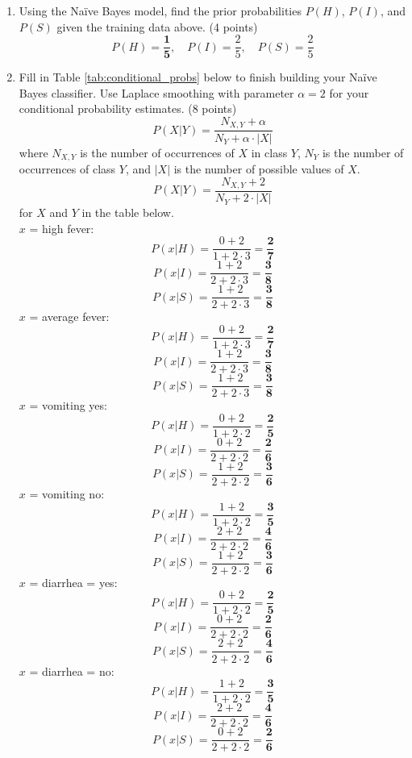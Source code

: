 \documentclass[a3paper,12pt]{article} %
\begin{document}
\begin{enumerate}
    \item Using the Na\"ive Bayes model, find the prior probabilities \( P(H) \), \( P(I) \), and \( P(S) \) given the training data above. (4 points)
    \[
    P(H) = \mathbf{\frac{1}{5}}, \quad P(I) = \frac{2}{5}, \quad P(S) = \frac{2}{5}
    \]
    \item Fill in Table \ref{tab:conditional_probs} below to finish building your Na\"ive Bayes classifier. Use Laplace smoothing with parameter \( \alpha = 2 \) for your conditional probability estimates. (8 points)
    \[
    P(X|Y) = \frac{N_{X,Y} + \alpha}{N_Y + \alpha \cdot |X|}
    \]
    where \( N_{X,Y} \) is the number of occurrences of \( X \) in class \( Y \), \( N_Y \) is the number of occurrences of class \( Y \), and \( |X| \) is the number of possible values of \( X \).
    \[
    P(X|Y) = \frac{N_{X,Y} + 2}{N_Y + 2 \cdot |X|}
    \]
    for \( X \) and \( Y \) in the table below.
    \\ \(x\) = high fever:
    \[
    P(x|H) = \frac{0 + 2}{1 + 2 \cdot 3} = \mathbf{\frac{2}{7}}
    \] 
    \[
    P(x|I) = \frac{1 + 2}{2 + 2 \cdot 3} = \mathbf{\frac{3}{8}}
    \]
    \[
    P(x|S) = \frac{1 + 2}{2 + 2 \cdot 3} = \mathbf{\frac{3}{8}}
    \]
    \(x\) = average fever:
    \[
    P(x|H) = \frac{0 + 2}{1 + 2 \cdot 3} = \mathbf{\frac{2}{7}}
    \]
    \[
    P(x|I) = \frac{1 + 2}{2 + 2 \cdot 3} = \mathbf{\frac{3}{8}}
    \]
    \[
    P(x|S) = \frac{1 + 2}{2 + 2 \cdot 3} = \mathbf{\frac{3}{8}}
    \]
    \(x\) = vomiting yes:
    \[
    P(x|H) = \frac{0 + 2}{1 + 2 \cdot 2} = \mathbf{\frac{2}{5}}
    \]
    \[
    P(x|I) = \frac{0 + 2}{2 + 2 \cdot 2} = \mathbf{\frac{2}{6}}
    \]
    \[
    P(x|S) = \frac{1 + 2}{2 + 2 \cdot 2} = \mathbf{ \frac{3}{6}}
    \]
    \(x\) = vomiting no:
    \[
    P(x|H) = \frac{1 + 2}{1 + 2 \cdot 2} = \mathbf{\frac{3}{5}}
    \]
    \[
    P(x|I) = \frac{2 + 2}{2 + 2 \cdot 2} = \mathbf{\frac{4}{6}}
    \]
    \[
    P(x|S) = \frac{1 + 2}{2 + 2 \cdot 2} = \mathbf{\frac{3}{6}}
    \]
    \(x\) = diarrhea = yes:
    \[
    P(x|H) = \frac{0 + 2}{1 + 2 \cdot 2} = \mathbf{\frac{2}{5}}
    \]
    \[
    P(x|I) = \frac{0 + 2}{2 + 2 \cdot 2} = \mathbf{\frac{2}{6}}
    \]
    \[
    P(x|S) = \frac{2 + 2}{2 + 2 \cdot 2} = \mathbf{\frac{4}{6}}
    \]
    \(x\) = diarrhea = no:
    \[
    P(x|H) = \frac{1 + 2}{1 + 2 \cdot 2} = \mathbf{\frac{3}{5}}
    \]
    \[
    P(x|I) = \frac{2 + 2}{2 + 2 \cdot 2} = \mathbf{\frac{4}{6}}
    \]
    \[
    P(x|S) = \frac{0 + 2}{2 + 2 \cdot 2} = \mathbf{\frac{2}{6}}
    \]
    

\end{enumerate}
\end{document}
